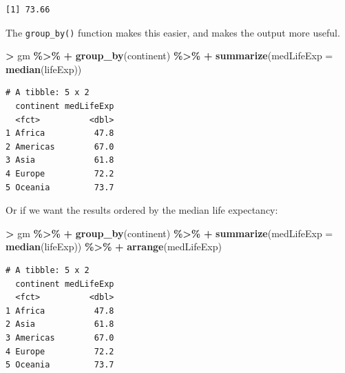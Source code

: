 \documentclass[
]{krantz}
\makeatletter
\newenvironment{Shaded}{\begin{snugshade}}{\end{snugshade}}
\newcommand{\DataTypeTok}[1]{\textcolor[rgb]{0.27,0.27,0.27}{#1}}
\newcommand{\KeywordTok}[1]{\textcolor[rgb]{0.27,0.27,0.27}{\textbf{#1}}}
\newcommand{\NormalTok}[1]{#1}
\newcommand{\OperatorTok}[1]{\textcolor[rgb]{0.43,0.43,0.43}{\textbf{#1}}}
\newcommand{\StringTok}[1]{\textcolor[rgb]{0.5,0.5,0.5}{#1}}
\newenvironment{kframe}{%
\medskip{}
\setlength{\fboxsep}{.8em}
 \def\at@end@of@kframe{}%
 \ifinner\ifhmode%
  \def\at@end@of@kframe{\end{minipage}}%
  \begin{minipage}{\columnwidth}%
 \fi\fi%
 \def\FrameCommand##1{\hskip\@totalleftmargin \hskip-\fboxsep
 \colorbox{shadecolor}{##1}\hskip-\fboxsep
     \hskip-\linewidth \hskip-\@totalleftmargin \hskip\columnwidth}%
 \MakeFramed {\advance\hsize-\width
   \@totalleftmargin\z@ \linewidth\hsize
   \@setminipage}}%
 {\par\unskip\endMakeFramed%
 \at@end@of@kframe}
\renewenvironment{Shaded}{\begin{kframe}}{\end{kframe}}
\makeatother
\begin{document}
\begin{Shaded}
\end{Shaded}

\begin{verbatim}
[1] 73.66
\end{verbatim}

The \texttt{group\_by()} function makes this easier, and makes the output more useful.

\begin{Shaded}
\begin{Highlighting}[]
\OperatorTok{\textgreater{}}\StringTok{ }\NormalTok{gm }\OperatorTok{\%\textgreater{}\%}\StringTok{ }
\OperatorTok{+}\StringTok{   }\KeywordTok{group\_by}\NormalTok{(continent) }\OperatorTok{\%\textgreater{}\%}\StringTok{ }
\OperatorTok{+}\StringTok{   }\KeywordTok{summarize}\NormalTok{(}\DataTypeTok{medLifeExp =} \KeywordTok{median}\NormalTok{(lifeExp)) }
\end{Highlighting}
\end{Shaded}

\begin{verbatim}
# A tibble: 5 x 2
  continent medLifeExp
  <fct>          <dbl>
1 Africa          47.8
2 Americas        67.0
3 Asia            61.8
4 Europe          72.2
5 Oceania         73.7
\end{verbatim}

Or if we want the results ordered by the median life expectancy:

\begin{Shaded}
\begin{Highlighting}[]
\OperatorTok{\textgreater{}}\StringTok{ }\NormalTok{gm }\OperatorTok{\%\textgreater{}\%}\StringTok{ }
\OperatorTok{+}\StringTok{   }\KeywordTok{group\_by}\NormalTok{(continent) }\OperatorTok{\%\textgreater{}\%}\StringTok{ }
\OperatorTok{+}\StringTok{   }\KeywordTok{summarize}\NormalTok{(}\DataTypeTok{medLifeExp =} \KeywordTok{median}\NormalTok{(lifeExp)) }\OperatorTok{\%\textgreater{}\%}\StringTok{ }
\OperatorTok{+}\StringTok{   }\KeywordTok{arrange}\NormalTok{(medLifeExp)}
\end{Highlighting}
\end{Shaded}

\begin{verbatim}
# A tibble: 5 x 2
  continent medLifeExp
  <fct>          <dbl>
1 Africa          47.8
2 Asia            61.8
3 Americas        67.0
4 Europe          72.2
5 Oceania         73.7
\end{verbatim}
\end{document}

